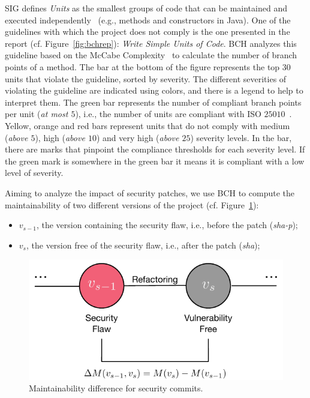 \documentclass[smallextended]{svjour3}       %
\begin{document}
SIG defines \emph{Units} as the smallest groups of code that can be 
maintained and executed independently~\cite{Visser:2016:OREILLY} 
(e.g., methods and constructors in Java). One of the guidelines with 
which the project does not comply is the one presented in the report 
(cf. Figure~\ref{fig:bchrep}): \emph{Write Simple Units of Code}. BCH 
analyzes this guideline based on the McCabe 
Complexity~\cite{1702388} to calculate the number of branch points 
of a method. The bar at the bottom of the figure represents the top 
$30$ units that violate the guideline, sorted by severity. The 
different severities of violating the guideline are indicated using 
colors, and there is a legend to help to interpret them. The green 
bar represents the number of compliant branch points per unit 
(\emph{at most $5$}), i.e., the number of units are compliant with 
ISO $25010$~\cite{iso:2011}. Yellow, orange and red bars represent 
units that do not comply with medium (\emph{above $5$}), high 
(\emph{above $10$}) and very high (\emph{above $25$}) severity 
levels. In the bar, there are marks that pinpoint the compliance 
thresholds for each severity level. If the green mark is somewhere 
in the green bar it means it is compliant with a low level of
severity.

Aiming to analyze the impact of security patches, we use BCH to compute 
the maintainability of two different versions of the project 
(cf. Figure~\ref{fig:commit}):

\begin{itemize}
	\item $v_{s-1}$, the version containing the security flaw, i.e., 
	before the patch (\emph{sha-p});
	\item $v_{s}$, the version free of the security flaw, i.e., 
	after the patch (\emph{sha});
\end{itemize}

\begin{figure}[h]
 	\centering 	
	\includegraphics[width=0.5\linewidth]{figures/commit.pdf}
 	\caption{Maintainability difference for security commits.}
	\label{fig:commit}
\end{figure}
\end{document}

